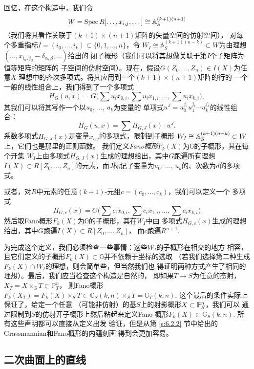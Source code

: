 回忆，在这个构造中，我们令
\[
	W=\spec R[\dots,x_{i,j},\dots]\cong \bba_S^{(k+1)(n+1)}
\]
（我们将其看作关联于$(k+1)\times (n+1)$矩阵的矢量空间的仿射空间），
对每个多重指标$I=(i_0,\dots,i_k)\subset \{0,1,\dots,n\}$，令
$W_I\cong \mathbb A_S^{(k+1)(n-k)}\subset W$为由理想
$(\dots,x_{i_\alpha,j_\beta}-\delta_{\alpha,\beta},\dots)$给出的
闭子概形（我们可以将其想做关联于第$I$个子矩阵为恒等矩阵的矩阵的
子空间的仿射空间）。现在，假设$G(Z_0,\dots,Z_n)\in I(X)$为任意$X$
理想中的齐次多项式。将其应用到一个$(k+1)\times (n+1)$矩阵的行的
一个一般的线性组合上，我们得到了一个多项式
\[
	H_G(u,x)=G\bigl(\sum u_ix_{0,i},\sum u_ix_{1,i},\dots,\sum u_ix_{k,i}\bigr),
\]
其我们可以将其写作一个以$u_0$, $\dots$, $u_k$为变量的
单项式$u^J=u_0^{j_0}u_1^{j_1}\cdots u_k^{j_k}$的线性组合：
\[
	H_G(u,x)=\sum H_{G,J}(x)\cdot u^J.
\]
系数多项式$H_{G,J}(x)$是变量$x_{i,j}$的多项式，限制到子概形
$W_I\cong \A_S^{(k+1)(n-k)}\subset W$上，它们也是那里的正则函数。
我们定义\emph{Fano概形}$F_k(X)$为$\mathbb G$的子概形，其在每个开集
$W_I$上由多项式$H_{G,J}(x)$生成的理想给出，其中$G$跑遍所有理想
$I(X)\subset R[Z_0,\dots,Z_n]$的元素，而$J$标记了变量为$u_0$, $\dots$, 
$u_k$的、次数为$d$的多项式。

或者，对$R$中元素的任意$(k+1)$-元组$c=(c_0,\dots,c_k)$，我们可以定义一个
多项式
\[
	H_{G,c}(x)=G\bigl(\sum c_ix_{0,i},\sum c_ix_{1,i},\dots,\sum c_ix_{k,i}\bigr)
\]
然后取Fano概形$F_k(X)$为$\mathbb G$的子概形，其在$W_I$中由
多项式$H_{G,c}(x)$生成的理想给出，其中$G$跑遍$I(X)\subset R[Z_0,\dots,Z_n]$，
而$c$跑遍$R^{n+1}$.


为完成这个定义，我们必须检查一些事情：这些$W_I$的子概形在相交的地方
相容，且它们定义的子概形$F_k(X)\subset \mathbb G$并不依赖于坐标的选取
（若我们选择第二种生成$F_k(X)\cap W_I$的理想，则会简单些，但当然我们也
得证明两种方式产生了相同的理想）。最后，我们应当检查这个构造是自然的，
即如果$T\to S$为任意的态射，$X_T=X\times_S T\subset \mathbb P_T^n$，
则Fano概形$F_k(X_T)=F_k(X)\times_S T\subset \mathbb G_S(k,n)\times_S T
=\mathbb G_{T}(k,n)$. 这个最后的条件实际上保证了，给定一个任意
（可能非仿射）的基$S$上的射影概形$X\subset \P_S^n$，我们可以
通过限制到$S$的仿射开子概形上然后粘起来定义Fano
概形$F_k(X)\subset \mathbb G_S(k,n)$. 所有这些声明都可以直接从定义出发
验证，但是从第 \ref{s:6.2.2} 节中给出的Grassmannian和Fano概形的内蕴刻画
得到会更加容易。

\subsection{二次曲面上的直线}\label{s:4.3.2}

